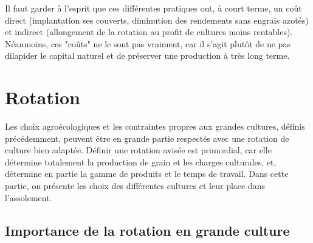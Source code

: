 \documentclass{book}
\begin{document}
Il faut garder à l'esprit que ces différentes pratiques ont, à court terme, un coût direct (implantation ses couverts, diminution des rendements sans engrais azotés) et indirect (allongement de la rotation au profit de cultures moins rentables). Néanmoins, ces "coûts" ne le sont pas vraiment, car il s'agit plutôt de ne pas dilapider le capital naturel et de préserver une production à très long terme.


\section{Rotation}

Les choix agroécologiques et les contraintes propres aux grandes cultures, définis précédemment, peuvent être en grande partie respectés avec une rotation de culture bien adaptée. Définir une rotation avisée est primordial, car elle détermine totalement la production de grain et les charges culturales, et, détermine en partie la gamme de produits et le temps de travail. Dans cette partie, on présente les choix des différentes cultures et leur place dans l'assolement.

\subsection{Importance de la rotation en grande culture}
\end{document}
